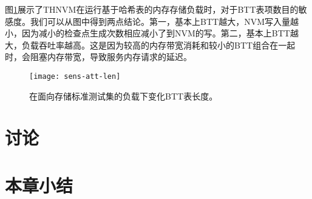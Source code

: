 图\ref{fig:sens-att-len}展示了THNVM在运行基于哈希表的内存存储负载时，对于BTT表项数目的敏感度。我们可以从图中得到两点结论。第一，基本上BTT越大，NVM写入量越小，因为减小的检查点生成次数相应减小了到NVM的写。第二，基本上BTT越大，负载吞吐率越高。这是因为较高的内存带宽消耗和较小的BTT组合在一起时，会阻塞内存带宽，导致服务内存请求的延迟。

\begin{figure}[!ht]
  \centering
  \texttt{[image: sens-att-len]}
  \caption{在面向存储标准测试集的负载下变化BTT表长度。}
  \label{fig:sens-att-len}
\end{figure}

\section{讨论}
\label{sec:thnvm-discuss}

\section{本章小结}


